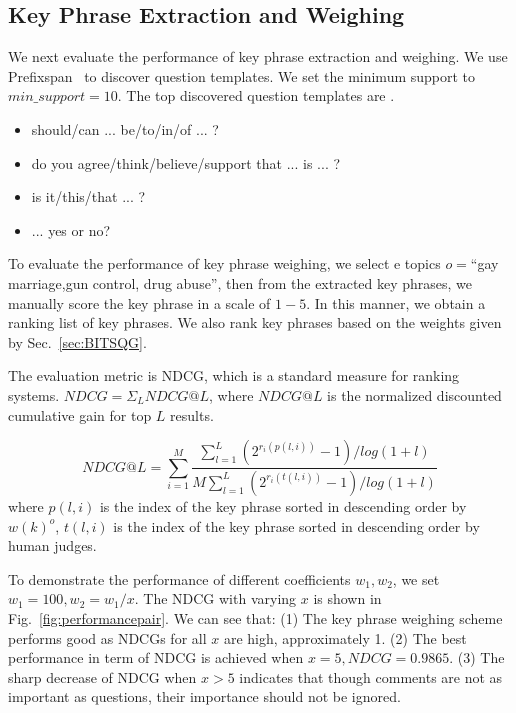 \documentclass{llncs}
\begin{document}
\subsection{Key Phrase Extraction and Weighing}

We next evaluate the performance of key phrase extraction and weighing. We use Prefixspan~\cite{Han2001Prefixspan} to discover question templates. We set the minimum support to $min\_support = 10$.  The top discovered question templates are .

\begin{itemize}
\item  should/can ... be/to/in/of ... ?
\item  do you agree/think/believe/support that ... is ... ?
\item is it/this/that ... ?
\item ... yes or no?
\end{itemize}



To evaluate the performance of key phrase weighing, we select e topics $o=$``gay marriage,gun control, drug abuse'', then from the extracted key phrases, we manually score the key phrase in a scale of $1-5$. In this manner, we obtain a ranking list of key phrases. We also rank key phrases based on the weights given by Sec.~\ref{sec:BITSQG}. 

The evaluation metric is NDCG, which is a standard measure for ranking systems.   $NDCG=\Sigma_L NDCG@L$, where $NDCG@L$ is the normalized discounted cumulative gain for top $L$ results. 

\begin{equation}
NDCG@L=\sum\limits_{i=1}^{M}\frac{\sum_{l=1}^{L}(2^{r_{i}(p(l,i))}-1)/log(1+l)}{M\sum_{l=1}^{L}(2^{r_{i}(t(l,i))}-1)/log(1+l)}
\end{equation}
where $p(l,i)$ is the index of the key phrase sorted in descending order by $w(k)^o$, $t(l,i)$ is the index of the key phrase sorted in descending order by human judges.

To demonstrate the performance of different coefficients $w_1,w_2$, we set  $w_1=100, w_2=w_1/x$. The NDCG with varying $x$ is shown in Fig.~\ref{fig:performancepair}. We can see that: (1) The key phrase weighing scheme performs good as NDCGs for all $x$ are high, approximately 1. (2) The best performance in term of NDCG is achieved when $x=5,NDCG=0.9865$. (3) The sharp decrease of NDCG when $x>5$ indicates that though comments are not as important as questions, their importance should not be ignored.
\end{document}
